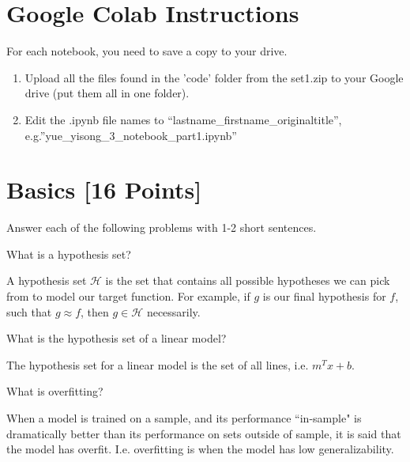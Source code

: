 \documentclass{article}
\begin{document}
\section*{Google Colab Instructions}

For each notebook, you need to save a copy to your drive.

\begin{enumerate}
	\item Upload all the files found in the 'code' folder from the set1.zip to your Google drive (put them all in one folder).
	\item Edit the .ipynb file names to “lastname_firstname_originaltitle”, e.g.”yue_yisong_3_notebook_part1.ipynb”
\end{enumerate}


\newpage
\section{Basics [16 Points]}

Answer each of the following problems with 1-2 short sentences.

\begin{problem}[2]
  What is a hypothesis set?
\end{problem}
\begin{solution}
  A hypothesis set $\mathcal{H}$ is the set that contains all possible hypotheses we can pick from to model our target function. For example, if $g$ is our final hypothesis for $f$, such that $g\approx f$, then $g\in \mathcal{H}$ necessarily. 
\end{solution}

\begin{problem}[2]
  What is the hypothesis set of a linear model?
\end{problem}
\begin{solution}
  The hypothesis set for a linear model is the set of all lines, i.e. $m^{T}x + b$. 
\end{solution}

\begin{problem}[2]
  What is overfitting?
\end{problem}
\begin{solution}
  When a model is trained on a sample, and its performance ``in-sample" is dramatically better than its performance on sets outside of sample, it is said that the model has overfit.  I.e. overfitting is when the model has low generalizability.
\end{solution}
\end{document}
